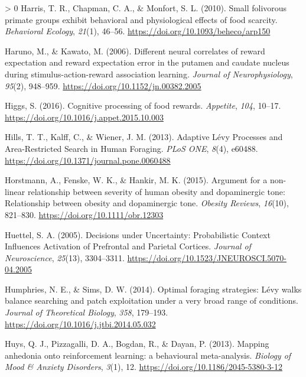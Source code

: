 \documentclass[
]{/home/nicoluarte/Downloads/templates/PNAS-template-main.tex}
\newlength{\cslhangindent}
\newenvironment{CSLReferences}[3] %
 {%
  \setlength{\parindent}{0pt}
  \ifodd #1 \everypar{\setlength{\hangindent}{\cslhangindent}}\ignorespaces\fi
  \ifnum #2 > 0
  \setlength{\parskip}{#2\baselineskip}
  \fi
 }%
 {}
\begin{document}
\begin{CSLReferences}{1}{0}
\leavevmode\hypertarget{ref-G83L8BXA}{}%
Harris, T. R., Chapman, C. A., \& Monfort, S. L. (2010). Small
folivorous primate groups exhibit behavioral and physiological effects
of food scarcity. \emph{Behavioral Ecology}, \emph{21}(1), 46--56.
\url{https://doi.org/10.1093/beheco/arp150}

\leavevmode\hypertarget{ref-DAKDZEVY}{}%
Haruno, M., \& Kawato, M. (2006). Different neural correlates of reward
expectation and reward expectation error in the putamen and caudate
nucleus during stimulus-action-reward association learning.
\emph{Journal of Neurophysiology}, \emph{95}(2), 948--959.
\url{https://doi.org/10.1152/jn.00382.2005}

\leavevmode\hypertarget{ref-J37T9F5T}{}%
Higgs, S. (2016). Cognitive processing of food rewards. \emph{Appetite},
\emph{104}, 10--17. \url{https://doi.org/10.1016/j.appet.2015.10.003}

\leavevmode\hypertarget{ref-A5N6NMAB}{}%
Hills, T. T., Kalff, C., \& Wiener, J. M. (2013). Adaptive Lévy
Processes and Area-Restricted Search in Human Foraging. \emph{PLoS ONE},
\emph{8}(4), e60488. \url{https://doi.org/10.1371/journal.pone.0060488}

\leavevmode\hypertarget{ref-67GSY6VY}{}%
Horstmann, A., Fenske, W. K., \& Hankir, M. K. (2015). Argument for a
non-linear relationship between severity of human obesity and
dopaminergic tone: Relationship between obesity and dopaminergic tone.
\emph{Obesity Reviews}, \emph{16}(10), 821--830.
\url{https://doi.org/10.1111/obr.12303}

\leavevmode\hypertarget{ref-ZRTDBMRA}{}%
Huettel, S. A. (2005). Decisions under Uncertainty: Probabilistic
Context Influences Activation of Prefrontal and Parietal Cortices.
\emph{Journal of Neuroscience}, \emph{25}(13), 3304--3311.
\url{https://doi.org/10.1523/JNEUROSCI.5070-04.2005}

\leavevmode\hypertarget{ref-M5RXPXSZ}{}%
Humphries, N. E., \& Sims, D. W. (2014). Optimal foraging strategies:
Lévy walks balance searching and patch exploitation under a very broad
range of conditions. \emph{Journal of Theoretical Biology}, \emph{358},
179--193. \url{https://doi.org/10.1016/j.jtbi.2014.05.032}

\leavevmode\hypertarget{ref-JGKMEKV6}{}%
Huys, Q. J., Pizzagalli, D. A., Bogdan, R., \& Dayan, P. (2013). Mapping
anhedonia onto reinforcement learning: a behavioural meta-analysis.
\emph{Biology of Mood \& Anxiety Disorders}, \emph{3}(1), 12.
\url{https://doi.org/10.1186/2045-5380-3-12}


\end{CSLReferences}
\end{document}
